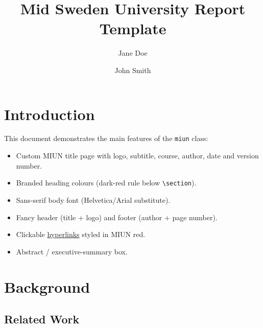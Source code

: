 \documentclass{miun}
\title{Mid Sweden University Report Template}
\author{Jane Doe \and John Smith}
\begin{document}
\maketitle          %

\begin{abstract}
  \lipsum[1]
\end{abstract}

\tableofcontents
\newpage

\section{Introduction}

\lipsum[2]

This document demonstrates the main features of the \texttt{miun} class:
\begin{itemize}
  \item Custom MIUN title page with logo, subtitle, course, author, date and
        version number.
  \item Branded heading colours (dark-red rule below \verb|\section|).
  \item Sans-serif body font (Helvetica/Arial substitute).
  \item Fancy header (title + logo) and footer (author + page number).
  \item Clickable \href{https://www.miun.se}{hyperlinks} styled in MIUN red.
  \item Abstract / executive-summary box.
\end{itemize}

\lipsum[3]

\section{Background}

\lipsum[4-5]

\subsection{Related Work}
\end{document}

